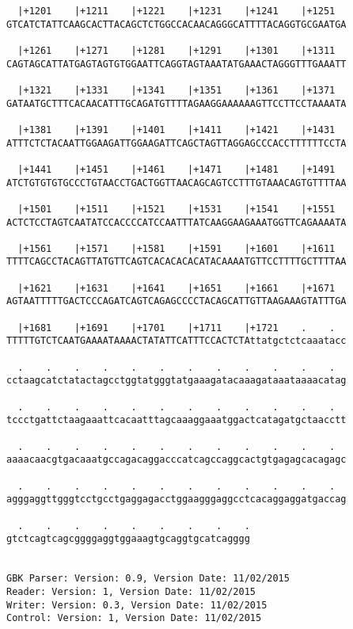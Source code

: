 \documentclass{article}
\begin{document}
\begin{Verbatim}
  |+1201    |+1211    |+1221    |+1231    |+1241    |+1251  
GTCATCTATTCAAGCACTTACAGCTCTGGCCACAACAGGGCATTTTACAGGTGCGAATGA
                                                            
  |+1261    |+1271    |+1281    |+1291    |+1301    |+1311  
CAGTAGCATTATGAGTAGTGTGGAATTCAGGTAGTAAATATGAAACTAGGGTTTGAAATT
                                                            
  |+1321    |+1331    |+1341    |+1351    |+1361    |+1371  
GATAATGCTTTCACAACATTTGCAGATGTTTTAGAAGGAAAAAAGTTCCTTCCTAAAATA
                                                            
  |+1381    |+1391    |+1401    |+1411    |+1421    |+1431  
ATTTCTCTACAATTGGAAGATTGGAAGATTCAGCTAGTTAGGAGCCCACCTTTTTTCCTA
                                                            
  |+1441    |+1451    |+1461    |+1471    |+1481    |+1491  
ATCTGTGTGTGCCCTGTAACCTGACTGGTTAACAGCAGTCCTTTGTAAACAGTGTTTTAA
                                                            
  |+1501    |+1511    |+1521    |+1531    |+1541    |+1551  
ACTCTCCTAGTCAATATCCACCCCATCCAATTTATCAAGGAAGAAATGGTTCAGAAAATA
                                                            
  |+1561    |+1571    |+1581    |+1591    |+1601    |+1611  
TTTTCAGCCTACAGTTATGTTCAGTCACACACACATACAAAATGTTCCTTTTGCTTTTAA
                                                            
  |+1621    |+1631    |+1641    |+1651    |+1661    |+1671  
AGTAATTTTTGACTCCCAGATCAGTCAGAGCCCCTACAGCATTGTTAAGAAAGTATTTGA
                                                            
  |+1681    |+1691    |+1701    |+1711    |+1721    .    .  
TTTTTGTCTCAATGAAAATAAAACTATATTCATTTCCACTCTAttatgctctcaaatacc
                                                            
  .    .    .    .    .    .    .    .    .    .    .    .  
cctaagcatctatactagcctggtatgggtatgaaagatacaaagataaataaaacatag
                                                            
  .    .    .    .    .    .    .    .    .    .    .    .  
tccctgattctaagaaattcacaatttagcaaaggaaatggactcatagatgctaacctt
                                                            
  .    .    .    .    .    .    .    .    .    .    .    .  
aaaacaacgtgacaaatgccagacaggacccatcagccaggcactgtgagagcacagagc
                                                            
  .    .    .    .    .    .    .    .    .    .    .    .  
agggaggttgggtcctgcctgaggagacctggaagggaggcctcacaggaggatgaccag
                                                            
  .    .    .    .    .    .    .    .    .
gtctcagtcagcggggaggtggaaagtgcaggtgcatcagggg
                                           
                                           
GBK Parser: Version: 0.9, Version Date: 11/02/2015
Reader: Version: 1, Version Date: 11/02/2015
Writer: Version: 0.3, Version Date: 11/02/2015
Control: Version: 1, Version Date: 11/02/2015
\end{Verbatim}
\end{document}
